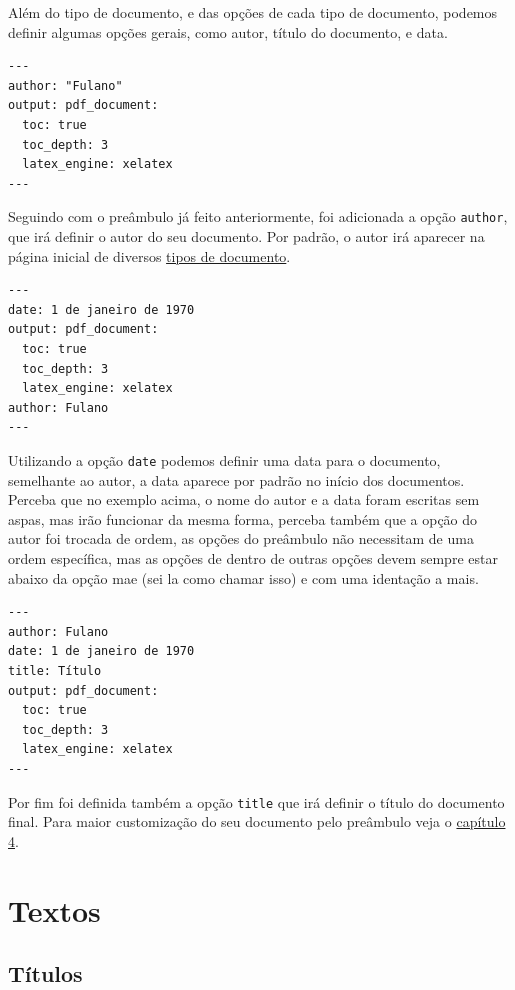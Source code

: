 \documentclass[
]{book}
\begin{document}
Além do tipo de documento, e das opções de cada tipo de documento, podemos definir algumas opções gerais, como autor, título do documento, e data.

\begin{verbatim}
---
author: "Fulano"
output: pdf_document:
  toc: true
  toc_depth: 3
  latex_engine: xelatex
---
\end{verbatim}

Seguindo com o preâmbulo já feito anteriormente, foi adicionada a opção \texttt{author}, que irá definir o autor do seu documento. Por padrão, o autor irá aparecer na página inicial de diversos \protect\hyperlink{possuxedveis-tipos-de-outputs}{tipos de documento}.

\begin{verbatim}
---
date: 1 de janeiro de 1970
output: pdf_document:
  toc: true
  toc_depth: 3
  latex_engine: xelatex
author: Fulano
---
\end{verbatim}

Utilizando a opção \texttt{date} podemos definir uma data para o documento, semelhante ao autor, a data aparece por padrão no início dos documentos.
Perceba que no exemplo acima, o nome do autor e a data foram escritas sem aspas, mas irão funcionar da mesma forma, perceba também que a opção do autor foi trocada de ordem, as opções do preâmbulo não necessitam de uma ordem específica, mas as opções de dentro de outras opções devem sempre estar abaixo da opção mae (sei la como chamar isso) e com uma identação a mais.

\begin{verbatim}
---
author: Fulano
date: 1 de janeiro de 1970
title: Título
output: pdf_document:
  toc: true
  toc_depth: 3
  latex_engine: xelatex
---
\end{verbatim}

Por fim foi definida também a opção \texttt{title} que irá definir o título do documento final. Para maior customização do seu documento pelo preâmbulo veja o \protect\hyperlink{depois-crio}{capítulo 4}.

\hypertarget{textos}{%
\section{Textos}\label{textos}}

\hypertarget{tuxedtulos}{%
\subsection{Títulos}\label{tuxedtulos}}
\end{document}

